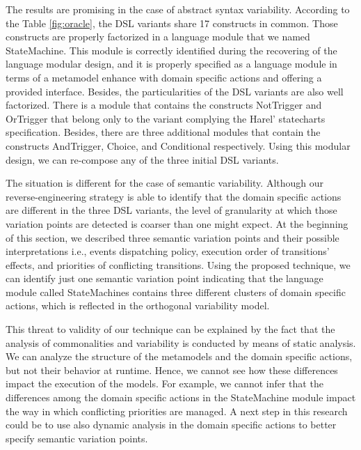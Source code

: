 The results are promising in the case of abstract syntax variability. According to the Table \ref{fig:oracle}, the DSL variants share 17 constructs in common. Those constructs are properly factorized in a language module that we named StateMachine. This module is correctly identified during the recovering of the language modular design, and it is properly specified as a language module in terms of a metamodel enhance with domain specific actions and offering a provided interface. Besides, the particularities of the DSL variants are also well factorized. There is a module that contains the constructs NotTrigger and OrTrigger that belong only to the variant complying the Harel' statecharts specification. Besides, there are three additional modules that contain the constructs AndTrigger, Choice, and Conditional respectively. Using this modular design, we can re-compose any of the three initial DSL variants.

The situation is different for the case of semantic variability. Although our reverse-engineering strategy is able to identify that the domain specific actions are different in the three DSL variants, the level of granularity at which those variation points are detected is coarser than one might expect. At the beginning of this section, we described three semantic variation points and their possible interpretations i.e., events dispatching policy, execution order of transitions' effects, and priorities of conflicting transitions. Using the proposed technique, we can identify just one semantic variation point indicating that the language module called StateMachines contains three different clusters of domain specific actions, which is reflected in the orthogonal variability model.

This threat to validity of our technique can be explained by the fact that the analysis of commonalities and variability is conducted by means of static analysis. We can analyze the structure of the metamodels and the domain specific actions, but not their behavior at runtime. Hence, we cannot see how these differences impact the execution of the models. For example, we cannot infer that the differences among the domain specific actions in the StateMachine module impact the way in which conflicting priorities are managed. A next step in this research could be to use also dynamic analysis in the domain specific actions to better specify semantic variation points. 

